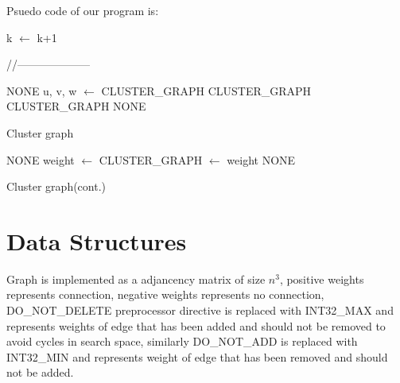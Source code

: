 \documentclass[5p,twocolumn,final]{elsarticle}
\begin{document}
Psuedo code of our program is:
\begin{algorithm}[H]
	\begin{algorithmic}	[1]
		    \State k $\gets$ k+1 \EndWhile
		\EndFunction
	\end{algorithmic}	
	//--------------------
	\begin{algorithmic}	[1]
    				\Return NONE
				\EndIf
				\State \State u, v, w $\gets$  
				\State {}
    				\Return \textup{CLUSTER\_GRAPH}
				\EndIf
    				\Return \textup{CLUSTER\_GRAPH}
				\EndIf
    				\Return \textup{CLUSTER\_GRAPH}
				\EndIf
				\State \State\Return NONE												
		\EndFunction
	\end{algorithmic}
 \caption{Cluster graph}
\end{algorithm}
\begin{algorithm}[h]	
	\begin{algorithmic}	[1]
				\Return NONE
			\EndIf
			\State\State weight $\gets$ 
			\State{}
				\State {}
			\EndIf
				\State {}
			\EndIf
			\State{}
	    				\Return CLUSTER\_GRAPH
			\EndIf
			\State\State {} $\gets$ weight			\quad\quad {}
			\State\State\Return NONE													
		\EndFunction
	\end{algorithmic}

\caption{Cluster graph(cont.)}
\end{algorithm}

\section{Data Structures}
Graph is implemented as a adjancency matrix of size $n^3$, positive weights represents connection, negative weights represents no connection, DO\_NOT\_DELETE preprocessor directive is replaced with INT32\_MAX and represents weights of edge that has been added and should not be removed to avoid cycles in search space, similarly DO\_NOT\_ADD is replaced with INT32\_MIN and represents weight of edge that has been removed and should not be added.
\end{document}
